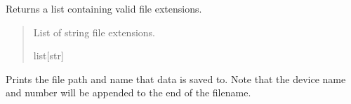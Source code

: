 \documentclass[letterpaper,10pt,english]{sphinxmanual}
\begin{document}
\begin{fulllineitems}
\begin{fulllineitems}
\label{\detokenize{Setup.SetupOneDevice:Setup.SetupOneDevice.Setup_PodInterface.SetupInterface.GetSupportedFileExtensions}}
\pysigstartsignatures
{}
\pysigstopsignatures
\sphinxAtStartPar
Returns a list containing valid file extensions.
\begin{quote}\begin{description}
\sphinxAtStartPar
List of string file extensions.

\sphinxAtStartPar
list{[}str{]}

\end{description}\end{quote}

\end{fulllineitems}


\begin{fulllineitems}
\label{\detokenize{Setup.SetupOneDevice:Setup.SetupOneDevice.Setup_PodInterface.SetupInterface.PrintSaveFile}}
\pysigstartsignatures
{}
\pysigstopsignatures
\sphinxAtStartPar
Prints the file path and name that data is saved to. Note that the device name and number         will be appended to the end of the filename.

\end{fulllineitems}



\end{fulllineitems}
\end{document}
